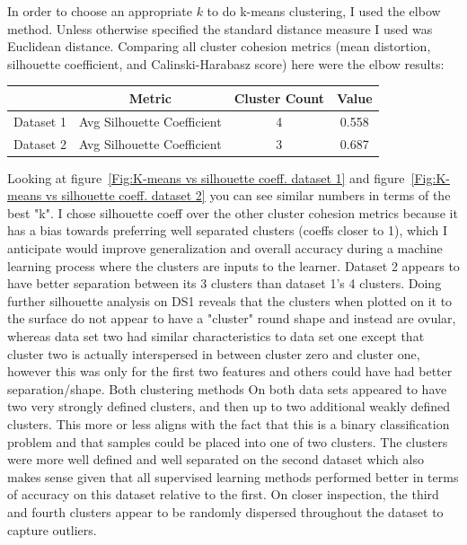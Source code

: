 In order to choose an appropriate $k$ to do k-means clustering, I used the elbow method\cite{developers_2020}.
Unless otherwise specified the standard distance measure I used was Euclidean distance.
Comparing all cluster cohesion metrics (mean distortion, silhouette coefficient, and Calinski-Harabasz score) here were
the elbow results:
\begin{center}
    \begin{tabular}{|c| c | c | c |}
        \hline
        & Metric                     & Cluster Count & Value \\
        \hline
        \hline
        Dataset 1 & Avg Silhouette Coefficient & 4             & 0.558 \\
        \hline
        Dataset 2 & Avg Silhouette Coefficient & 3             & 0.687 \\
        \hline
    \end{tabular}
\end{center}
Looking at figure~\ref{Fig:K-means vs silhouette coeff. dataset 1} and figure~\ref{Fig:K-means vs silhouette coeff. dataset 2} you can
see similar numbers in terms of the best "k".
I chose silhouette coeff over the other cluster cohesion metrics because it has a bias towards preferring well separated
clusters (coeffs closer to 1), which I anticipate would improve generalization and overall accuracy during a machine
learning process where the clusters are inputs to the learner.
Dataset 2 appears to have better separation between its 3 clusters than dataset 1's 4 clusters.
Doing further silhouette analysis on DS1 reveals that the clusters when plotted on it to the surface do not appear to
have a "cluster" round shape and instead are ovular, whereas data set two had similar characteristics to data set one
except that cluster two is actually interspersed in between cluster zero and cluster one, however this was only for the
first two features and others could have had better separation/shape.
Both clustering methods On both data sets appeared to have two very strongly defined clusters, and then up to two additional weakly defined clusters.
This more or less aligns with the fact that this is a binary classification problem and that samples could be placed into one of two clusters.
The clusters were more well defined and well separated on the second dataset which also makes sense given that all supervised learning methods performed better in terms of accuracy on this dataset relative to the first.
On closer inspection, the third and fourth clusters appear to be randomly dispersed throughout the dataset to capture outliers.
